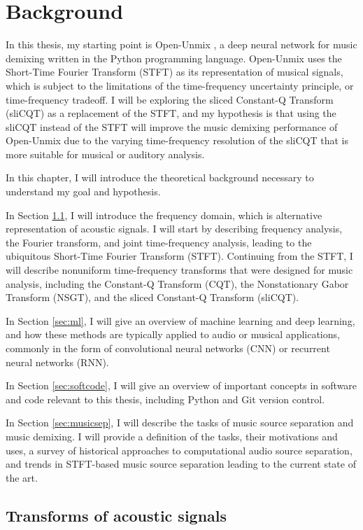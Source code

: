\documentclass[report.tex]{subfiles}
\begin{document}
\section{Background}
\label{ch:background}

In this thesis, my starting point is Open-Unmix \parencite{umx}, a deep neural network for music demixing written in the Python programming language. Open-Unmix uses the Short-Time Fourier Transform (STFT) as its representation of musical signals, which is subject to the limitations of the time-frequency uncertainty principle, or time-frequency tradeoff. I will be exploring the sliced Constant-Q Transform (sliCQT) as a replacement of the STFT, and my hypothesis is that using the sliCQT instead of the STFT will improve the music demixing performance of Open-Unmix due to the varying time-frequency resolution of the sliCQT that is more suitable for musical or auditory analysis.

In this chapter, I will introduce the theoretical background necessary to understand my goal and hypothesis.

In Section \ref{sec:freqdomain}, I will introduce the frequency domain, which is alternative representation of acoustic signals. I will start by describing frequency analysis, the Fourier transform, and joint time-frequency analysis, leading to the ubiquitous Short-Time Fourier Transform (STFT). Continuing from the STFT, I will describe nonuniform time-frequency transforms that were designed for music analysis, including the Constant-Q Transform (CQT), the Nonstationary Gabor Transform (NSGT), and the sliced Constant-Q Transform (sliCQT).

In Section \ref{sec:ml}, I will give an overview of machine learning and deep learning, and how these methods are typically applied to audio or musical applications, commonly in the form of convolutional neural networks (CNN) or recurrent neural networks (RNN).

In Section \ref{sec:softcode}, I will give an overview of important concepts in software and code relevant to this thesis, including Python and Git version control.

In Section \ref{sec:musicsep}, I will describe the tasks of music source separation and music demixing. I will provide a definition of the tasks, their motivations and uses, a survey of historical approaches to computational audio source separation, and trends in STFT-based music source separation leading to the current state of the art.

\subsection{Transforms of acoustic signals}
\label{sec:freqdomain}
\end{document}
